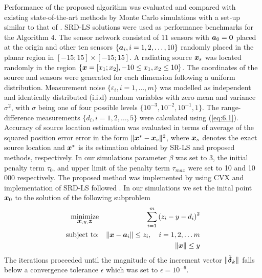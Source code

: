 Performance of the proposed algorithm was evaluated and compared with existing state-of-the-art methods by Monte Carlo simulations with a set-up similar to that of \cite{BeckStLi}. SRD-LS solutions were used as performance benchmarks for the Algorithm 4. The sensor network consisted of $11$ sensors with $\mbox{\boldmath$a$}_0 = \mbox{\boldmath{$0$}}$ placed at the origin and other ten sensors  $\{\mbox{\boldmath$a$}_i, i = 1, 2,\ldots,10\}$ randomly placed in the planar region in $[-15;15]\times[-15;15]$. A radiating source $\mbox{\boldmath$x$}_s$ was located randomly in the region $\{\mbox{\boldmath$x$}=[x_1;x_2], -10\leq x_1,x_2\leq 10\}$. The coordinates of the source and sensors were generated for each dimension following a uniform distribution. Measurement noise $\{\varepsilon_i, i=1,\ldots,m\}$ was modelled as independent and identically distributed (i.i.d) random variables with zero mean and variance $\sigma^2$, with $\sigma$ being one of four possible levels $\{10^{-3}, 10^{-2}, 10^{-1}, 1\}$.  The range-difference measurements $\{d_i, i=1, 2,\ldots,5\}$ were calculated using (\ref{eq:6.1}). Accuracy of source location estimation was evaluated in terms of average of the squared position error error in the form $\|\mbox{\boldmath$x$}^*-\mbox{\boldmath$x$}_s\|^2$, where $\mbox{\boldmath$x$}_s$ denotes the exact source location and $\mbox{\boldmath$x$}^*$ is its estimation obtained by SR-LS and proposed methods, respectively.  
In our simulations parameter $\beta$ was set to 3, the initial penalty term $\tau_0$, and upper limit of the penalty term $\tau_{max}$ were set to 10 and 10 000 respectively. The proposed method was implemented by using  CVX  \cite{cvx} and implementation of SRD-LS followed \cite{BeckStLi}. In our simulations we set the inital point $\mbox{\boldmath$x$}_0$ to the solution of the following subproblem
\setcounter{abc}{0}
\begin{eqnarray} \label{eq:initpnt}
\nonumber
\mathop{\mbox{minimize}}_{\mbox{\boldmath$x$}, y, \mbox{\boldmath$z$}} & &\sum^m_{i=1}\left( z_i - y - d_i\right)^2\\
\nonumber
\mbox{subject to:}& &\|\mbox{\boldmath$x$} - \mbox{\boldmath$a$}_i\| \leq z_i, \quad  i = 1, 2, \ldots m \\
\nonumber
& &\|\mbox{\boldmath$x$}\|  \leq y
\end{eqnarray}
\noindent
The iterations proceeded until the magnitude of the increment vector $\|\tilde{\mbox{\boldmath${\delta}$}}_k\|$ falls below a convergence tolerance $\epsilon$ which was set to $\epsilon = 10^{-6}$. 

